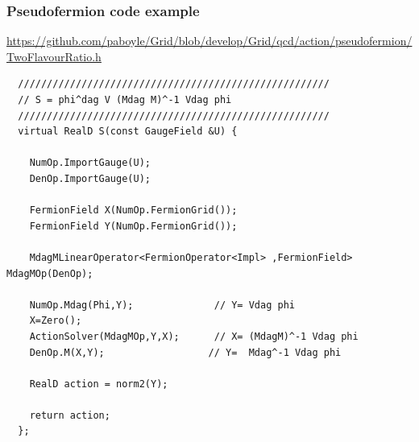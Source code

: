 \documentclass[pdf,ps,8pt]{beamer}
\newcommand{\link}[1]{\href{#1}{ {\color{blue} #1} }}
\begin{document}
\begin{frame}[fragile]\small\frametitle{ Pseudofermion code example }
\link{https://github.com/paboyle/Grid/blob/develop/Grid/qcd/action/pseudofermion/TwoFlavourRatio.h}
  {  \tiny
\begin{verbatim}
  //////////////////////////////////////////////////////
  // S = phi^dag V (Mdag M)^-1 Vdag phi
  //////////////////////////////////////////////////////
  virtual RealD S(const GaugeField &U) {

    NumOp.ImportGauge(U);
    DenOp.ImportGauge(U);

    FermionField X(NumOp.FermionGrid());
    FermionField Y(NumOp.FermionGrid());
	
    MdagMLinearOperator<FermionOperator<Impl> ,FermionField> MdagMOp(DenOp);

    NumOp.Mdag(Phi,Y);              // Y= Vdag phi
    X=Zero();
    ActionSolver(MdagMOp,Y,X);      // X= (MdagM)^-1 Vdag phi
    DenOp.M(X,Y);                  // Y=  Mdag^-1 Vdag phi

    RealD action = norm2(Y);

    return action;
  };
\end{verbatim}
}
\end{frame}
\end{document}
